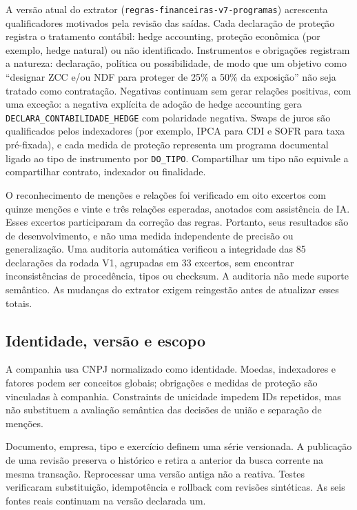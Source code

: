\documentclass[conference]{IEEEtran}
\begin{document}
A versão atual do extrator (\texttt{regras-financeiras-v7-programas}) acrescenta qualificadores motivados pela revisão das saídas. Cada declaração de proteção registra o tratamento contábil: hedge accounting, proteção econômica (por exemplo, hedge natural) ou não identificado. Instrumentos e obrigações registram a natureza: declaração, política ou possibilidade, de modo que um objetivo como ``designar ZCC e/ou NDF para proteger de 25\% a 50\% da exposição'' não seja tratado como contratação. Negativas continuam sem gerar relações positivas, com uma exceção: a negativa explícita de adoção de hedge accounting gera \texttt{DECLARA\_CONTABILIDADE\_HEDGE} com polaridade negativa. Swaps de juros são qualificados pelos indexadores (por exemplo, IPCA para CDI e SOFR para taxa pré-fixada), e cada medida de proteção representa um programa documental ligado ao tipo de instrumento por \texttt{DO\_TIPO}. Compartilhar um tipo não equivale a compartilhar contrato, indexador ou finalidade.

O reconhecimento de menções e relações foi verificado em oito excertos com quinze menções e vinte e três relações esperadas, anotados com assistência de IA. Esses excertos participaram da correção das regras. Portanto, seus resultados são de desenvolvimento, e não uma medida independente de precisão ou generalização. Uma auditoria automática verificou a integridade das 85 declarações da rodada V1, agrupadas em 33 excertos, sem encontrar inconsistências de procedência, tipos ou checksum. A auditoria não mede suporte semântico. As mudanças do extrator exigem reingestão antes de atualizar esses totais.

\subsection{Identidade, versão e escopo}

A companhia usa CNPJ normalizado como identidade. Moedas, indexadores e fatores podem ser conceitos globais; obrigações e medidas de proteção são vinculadas à companhia. Constraints de unicidade impedem IDs repetidos, mas não substituem a avaliação semântica das decisões de união e separação de menções.

Documento, empresa, tipo e exercício definem uma série versionada. A publicação de uma revisão preserva o histórico e retira a anterior da busca corrente na mesma transação. Reprocessar uma versão antiga não a reativa. Testes verificaram substituição, idempotência e rollback com revisões sintéticas. As seis fontes reais continuam na versão declarada um.
\end{document}
